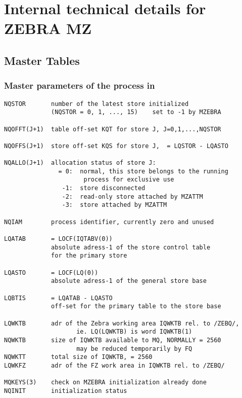 \chapter{Internal technical details for ZEBRA MZ}
\label{sec:H1-MZ-Internal-technical-details}

\section{Master Tables}

\subsection*{Master parameters of the process in }

\begin{verbatim}
NQSTOR       number of the latest store initialized
             (NQSTOR = 0, 1, ..., 15)    set to -1 by MZEBRA

NQOFFT(J+1)  table off-set KQT for store J, J=0,1,...,NQSTOR

NQOFFS(J+1)  store off-set KQS for store J,  = LQSTOR - LQASTO

NQALLO(J+1)  allocation status of store J:
               = 0:  normal, this store belongs to the running
                      process for exclusive use
                -1:  store disconnected
                -2:  read-only store attached by MZATTM
                -3:  store attached by MZATTM

NQIAM        process identifier, currently zero and unused

LQATAB       = LOCF(IQTABV(0))
             absolute adress-1 of the store control table
             for the primary store

LQASTO       = LOCF(LQ(0))
             absolute adress-1 of the general store base

LQBTIS       = LQATAB - LQASTO
             off-set for the primary table to the store base

LQWKTB       adr of the Zebra working area IQWKTB rel. to /ZEBQ/,
                    ie. LQ(LQWKTB) is word IQWKTB(1)
NQWKTB       size of IQWKTB available to MQ, NORMALLY = 2560
                    may be reduced temporarily by FQ
NQWKTT       total size of IQWKTB, = 2560
LQWKFZ       adr of the FZ work area in IQWKTB rel. to /ZEBQ/

MQKEYS(3)    check on MZEBRA initialization already done
NQINIT       initialization status


\end{verbatim}
